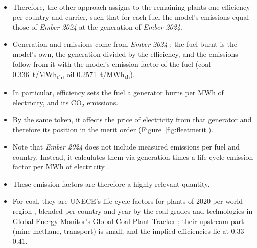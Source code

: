 \begin{itemize}[nosep,leftmargin=*]
  \item Therefore, the other approach assigns to the remaining plants one efficiency per country and carrier, such that for each fuel the model's emissions equal those of \textit{Ember 2024} at the generation of \textit{Ember 2024}.
  \item Generation and emissions come from \textit{Ember 2024} \citep{ember2025}; the fuel burnt is the model's own, the generation divided by the efficiency, and the emissions follow from it with the model's emission factor of the fuel (coal \SI{0.336}{t/MWh_{th}}, oil \SI{0.2571}{t/MWh_{th}}).
  \item In particular, efficiency sets the fuel a generator burns per MWh of electricity, and its CO$_2$ emissions.
  \item By the same token, it affects the price of electricity from that generator and therefore its position in the merit order (Figure~\ref{fig:fleetmerit}).
\item Note that \textit{Ember 2024} does not include measured emissions per fuel and country.
  Instead, it calculates them via generation times a life-cycle emission factor per MWh of electricity \citep{embermethod}.
  \item These emission factors are therefore a highly relevant quantity.
  \item For coal, they are UNECE's life-cycle factors for plants of 2020 per world region \citep{gibon2021}, blended per country and year by the coal grades and technologies in Global Energy Monitor's Global Coal Plant Tracker \citep{gcpt}; their upstream part (mine methane, transport) is small, and the implied efficiencies lie at 0.33--0.41.

\end{itemize}
